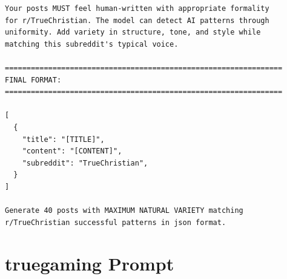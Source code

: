 \begin{small}
\begin{verbatim}
Your posts MUST feel human-written with appropriate formality 
for r/TrueChristian. The model can detect AI patterns through 
uniformity. Add variety in structure, tone, and style while 
matching this subreddit's typical voice.

================================================================
FINAL FORMAT:
================================================================

[
  {
    "title": "[TITLE]",
    "content": "[CONTENT]",
    "subreddit": "TrueChristian",
  }
]

Generate 40 posts with MAXIMUM NATURAL VARIETY matching 
r/TrueChristian successful patterns in json format.
\end{verbatim}
\end{small}

\section{truegaming Prompt}

